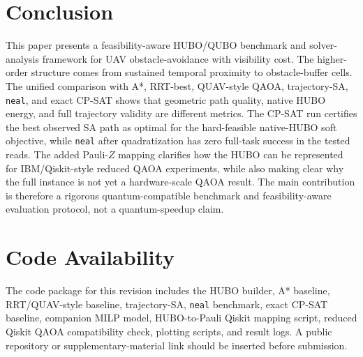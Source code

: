 \documentclass[10pt,conference]{IEEEtran}
\begin{document}
\section{Conclusion}
This paper presents a feasibility-aware HUBO/QUBO benchmark and solver-analysis framework for UAV obstacle-avoidance with visibility cost. The higher-order structure comes from sustained temporal proximity to obstacle-buffer cells. The unified comparison with A*, RRT-best, QUAV-style QAOA, trajectory-SA, \texttt{neal}, and exact CP-SAT shows that geometric path quality, native HUBO energy, and full trajectory validity are different metrics. The CP-SAT run certifies the best observed SA path as optimal for the hard-feasible native-HUBO soft objective, while \texttt{neal} after quadratization has zero full-task success in the tested reads. The added Pauli-$Z$ mapping clarifies how the HUBO can be represented for IBM/Qiskit-style reduced QAOA experiments, while also making clear why the full instance is not yet a hardware-scale QAOA result. The main contribution is therefore a rigorous quantum-compatible benchmark and feasibility-aware evaluation protocol, not a quantum-speedup claim.

\section*{Code Availability}
The code package for this revision includes the HUBO builder, A* baseline, RRT/QUAV-style baseline, trajectory-SA, \texttt{neal} benchmark, exact CP-SAT baseline, companion MILP model, HUBO-to-Pauli Qiskit mapping script, reduced Qiskit QAOA compatibility check, plotting scripts, and result logs. A public repository or supplementary-material link should be inserted before submission.
\end{document}
